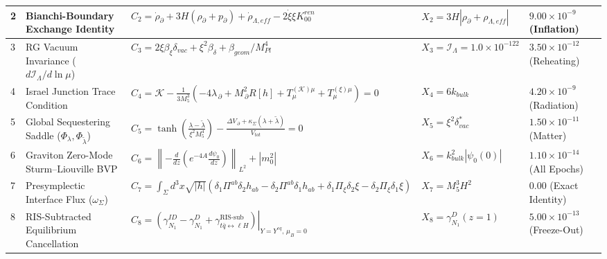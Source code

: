 \documentclass[aps,prd,onecolumn,superscriptaddress,nofootinbib,longbibliography,10pt]{revtex4-2}
\begin{document}
{{\begin{center}
\begin{tabular}{|lllll|}
      2 & Bianchi-Boundary Exchange Identity & \(C_2 = \dot{\rho}_\partial + 3H(\rho_\partial + p_\partial) + \dot{\rho}_{\Lambda,eff} - 2\dot{\xi}\xi K_{00}^{ren}\) & \(X_2 = 3H|\rho_\partial + \rho_{\Lambda,eff}|\) & \(9.00 \times 10^{-9}\) (Inflation) \\ \hline

      3 & RG Vacuum Invariance (\(d\mathcal{I}_\Lambda/d\ln\mu\)) & \(C_3 = 2\xi\beta_\xi\delta_{vac} + \xi^2\beta_\delta + \beta_{geom}/M_{Pl}^4\) & \(X_3 = \mathcal{I}_\Lambda = 1.0 \times {10^{-122}}\) & \(3.50 \times 10^{-12}\) (Reheating) \\ \hline

      4 & Israel Junction Trace Condition & \(\displaystyle C_{4} = \mathcal{K} - \frac{1}{3M_{5}^{3}}\left(-4\lambda_{\,\partial} + M_{\,\partial}^{2}R[h] + T_{\mu}^{(\mathcal{K})\mu} + T_{\mu}^{(\xi)\mu}\right) = 0\) & \(X_4 = 6k_{bulk}\) & \(4.20 \times 10^{-9}\) (Radiation) \\ \hline

      5 & Global Sequestering Saddle (\(\Phi_\lambda, \Phi_{\tilde{\lambda}}\)) & \(\displaystyle C_{5} = \tanh\!\left(\frac{\lambda - \tilde{\lambda}}{\xi^{2}M_{5}^{4}}\right) - \frac{\Delta V_{\,\partial} + \kappa_{\Sigma}(\lambda + \tilde{\lambda})}{V_{tot}} = 0\) & \(X_5 = \xi^2\delta_{vac}^*\) & \(1.50 \times 10^{-11}\) (Matter) \\ \hline

      6 & Graviton Zero-Mode Sturm–Liouville BVP & \(C_6 = \left\| -\frac{d}{dz}\left(e^{-4A}\frac{d\psi_0}{dz}\right) \right\|_{L^2} + |m_0^2|\) & \(X_6 = k_{bulk}^2|\psi_0(0)|\) & \(1.10 \times 10^{-14}\) (All Epochs) \\ \hline

      7 & Presymplectic Interface Flux (\(\omega_\Sigma\)) & \(C_7 = \int_\Sigma d^3x\sqrt{|h|}(\delta_1\Pi^{ab}\delta_2 h_{ab} - \delta_2\Pi^{ab}\delta_1 h_{ab} + \delta_1\Pi_\xi\delta_2\xi - \delta_2\Pi_\xi\delta_1\xi)\) & \(X_7 = M_5^3 H^2\) & \(0.00\) (Exact Identity) \\ \hline

      8 & RIS-Subtracted Equilibrium Cancellation & \(C_8 = \left.\left(\gamma_{N_1}^{ID} - \gamma_{N_1}^D + \gamma_{t\bar{q}\leftrightarrow\ell H}^{\text{RIS-sub}}\right)\right|_{Y=Y^{eq},\,\mu_B=0}\) & \(X_8 = \gamma_{N_1}^D(z=1)\) & \(5.00 \times 10^{-13}\) (Freeze-Out) \\ \hline

    
  \end{tabular}
\end{center}

}}
\end{document}
